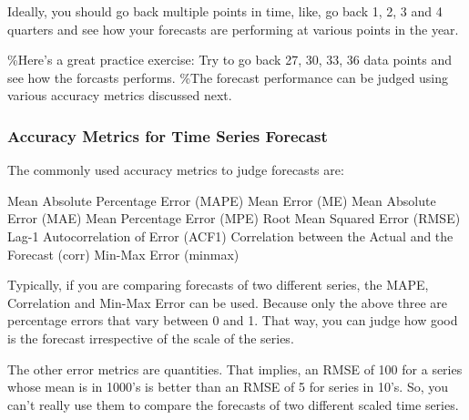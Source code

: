 \documentclass[11pt]{article}
\begin{document}
Ideally, you should go back multiple points in time, like, go back 1, 2,
3 and 4 quarters and see how your forecasts are performing at various
points in the year.

\%Here's a great practice exercise: Try to go back 27, 30, 33, 36 data
points and see how the forcasts performs. \%The forecast performance can
be judged using various accuracy metrics discussed next.

\hypertarget{accuracy-metrics-for-time-series-forecast}{%
\subsubsection{Accuracy Metrics for Time Series
Forecast}\label{accuracy-metrics-for-time-series-forecast}}

The commonly used accuracy metrics to judge forecasts are:

Mean Absolute Percentage Error (MAPE) Mean Error (ME) Mean Absolute
Error (MAE) Mean Percentage Error (MPE) Root Mean Squared Error (RMSE)
Lag-1 Autocorrelation of Error (ACF1) Correlation between the Actual and
the Forecast (corr) Min-Max Error (minmax)

Typically, if you are comparing forecasts of two different series, the
MAPE, Correlation and Min-Max Error can be used. Because only the above
three are percentage errors that vary between 0 and 1. That way, you can
judge how good is the forecast irrespective of the scale of the series.

The other error metrics are quantities. That implies, an RMSE of 100 for
a series whose mean is in 1000's is better than an RMSE of 5 for series
in 10's. So, you can't really use them to compare the forecasts of two
different scaled time series.
\end{document}

